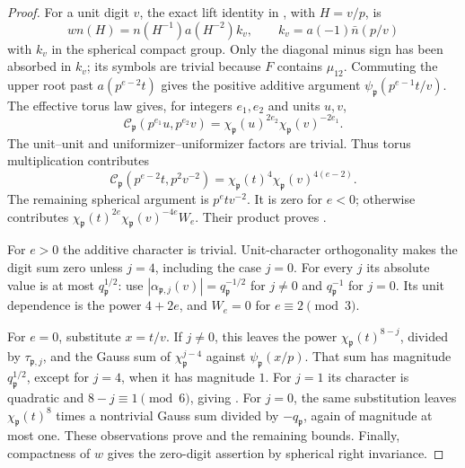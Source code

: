 \begin{proof}
For a unit digit \(v\), the exact lift identity in
, with \(H=v/p\), is
\[
 w n(H)=n(H^{-1})a(H^{-2})k_v,\qquad
 k_v=a(-1)\bar n(p/v)
\]
with \(k_v\) in the spherical compact group.  Only the diagonal minus
sign has been absorbed in \(k_v\); its symbols are trivial because
\(F\) contains \(\mu_{12}\).  Commuting the upper root past
\(a(p^{e-2}t)\) gives the positive additive argument
\(\psi_{\mathfrak p}(p^{e-1}t/v)\).  The effective torus law gives, for
integers \(e_1,e_2\) and units \(u,v\),
\[
 \mathcal C_{\mathfrak p}(p^{e_1}u,p^{e_2}v)
   =\chi_{\mathfrak p}(u)^{2e_2}\chi_{\mathfrak p}(v)^{-2e_1}.
\]
The unit--unit and uniformizer--uniformizer factors are trivial.  Thus
torus multiplication contributes
\[
 \mathcal C_{\mathfrak p}(p^{e-2}t,p^2v^{-2})
       =\chi_{\mathfrak p}(t)^4\chi_{\mathfrak p}(v)^{4(e-2)}.
\]
The remaining spherical argument is \(p^etv^{-2}\).  It is zero for
\(e<0\); otherwise  contributes
\(\chi_{\mathfrak p}(t)^{2e}\chi_{\mathfrak p}(v)^{-4e}W_e\).
Their product proves .

For \(e>0\) the additive character is trivial.  Unit-character
orthogonality makes the digit sum zero unless \(j=4\), including the
case \(j=0\).  For every \(j\) its absolute value is at most
\(q_{\mathfrak p}^{1/2}\): use
\(|\alpha_{\mathfrak p,j}(v)|=q_{\mathfrak p}^{-1/2}\) for \(j\ne0\)
and \(q_{\mathfrak p}^{-1}\) for \(j=0\).  Its unit dependence is the
power \(4+2e\), and \(W_e=0\) for \(e\equiv2\pmod3\).

For \(e=0\), substitute \(x=t/v\).  If \(j\ne0\), this leaves the power
\(\chi_{\mathfrak p}(t)^{8-j}\), divided by \(\tau_{\mathfrak p,j}\),
and the Gauss sum of \(\chi_{\mathfrak p}^{j-4}\) against
\(\psi_{\mathfrak p}(x/p)\).  That sum has magnitude
\(q_{\mathfrak p}^{1/2}\), except for \(j=4\), when it has magnitude \(1\).
For \(j=1\) its character is quadratic and \(8-j\equiv1\pmod6\),
giving .  For \(j=0\), the same
substitution leaves \(\chi_{\mathfrak p}(t)^8\) times a nontrivial
Gauss sum divided by \(-q_{\mathfrak p}\), again of magnitude at most one.
These observations prove  and the
remaining bounds.  Finally, compactness of \(w\) gives the zero-digit
assertion by spherical right invariance.
\end{proof}

